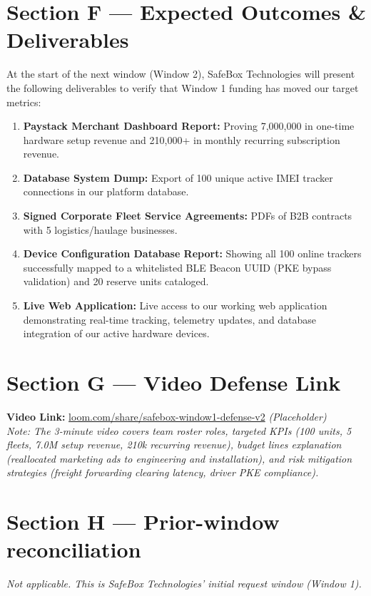 \documentclass[11pt,a4paper]{article}
\begin{document}
\vspace{0.3cm}

\section{Section F --- Expected Outcomes \& Deliverables}
At the start of the next window (Window 2), SafeBox Technologies will present the following deliverables to verify that Window 1 funding has moved our target metrics:
\begin{enumerate}
    \item \textbf{Paystack Merchant Dashboard Report:} Proving 7,000,000 in one-time hardware setup revenue and 210,000+ in monthly recurring subscription revenue.
    \item \textbf{Database System Dump:} Export of 100 unique active IMEI tracker connections in our platform database.
    \item \textbf{Signed Corporate Fleet Service Agreements:} PDFs of B2B contracts with 5 logistics/haulage businesses.
    \item \textbf{Device Configuration Database Report:} Showing all 100 online trackers successfully mapped to a whitelisted BLE Beacon UUID (PKE bypass validation) and 20 reserve units cataloged.
    \item \textbf{Live Web Application:} Live access to our working web application demonstrating real-time tracking, telemetry updates, and database integration of our active hardware devices.
\end{enumerate}

\vspace{0.3cm}

\section{Section G --- Video Defense Link}
\textbf{Video Link:} \href{https://loom.com/share/safebox-window1-defense-v2}{loom.com/share/safebox-window1-defense-v2} \textit{(Placeholder)} \\
\textit{Note: The 3-minute video covers team roster roles, targeted KPIs (100 units, 5 fleets, 7.0M setup revenue, 210k recurring revenue), budget lines explanation (reallocated marketing ads to engineering and installation), and risk mitigation strategies (freight forwarding clearing latency, driver PKE compliance).}

\vspace{0.3cm}

\section{Section H --- Prior-window reconciliation}
\textit{Not applicable. This is SafeBox Technologies' initial request window (Window 1).}
\end{document}

